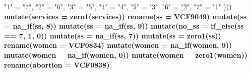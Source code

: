 \documentclass[
]{article}
\newenvironment{Shaded}{\begin{snugshade}}{\end{snugshade}}
\newcommand{\DataTypeTok}[1]{\textcolor[rgb]{0.13,0.29,0.53}{#1}}
\newcommand{\DecValTok}[1]{\textcolor[rgb]{0.00,0.00,0.81}{#1}}
\newcommand{\KeywordTok}[1]{\textcolor[rgb]{0.13,0.29,0.53}{\textbf{#1}}}
\newcommand{\NormalTok}[1]{#1}
\newcommand{\OperatorTok}[1]{\textcolor[rgb]{0.81,0.36,0.00}{\textbf{#1}}}
\newcommand{\StringTok}[1]{\textcolor[rgb]{0.31,0.60,0.02}{#1}}
\begin{document}
\begin{Shaded}
\begin{Highlighting}[]
{{{{{{{{{{{{{{{{{{{{{{{{{{{{{                                                                            \StringTok{"1"}\NormalTok{ =}\StringTok{ "7"}\NormalTok{,}
                                                                            \StringTok{"2"}\NormalTok{ =}\StringTok{ "6"}\NormalTok{,}
                                                                            \StringTok{"3"}\NormalTok{ =}\StringTok{ "5"}\NormalTok{,}
                                                                            \StringTok{"4"}\NormalTok{ =}\StringTok{ "4"}\NormalTok{,}
                                                                            \StringTok{"5"}\NormalTok{ =}\StringTok{ "3"}\NormalTok{,}
                                                                            \StringTok{"6"}\NormalTok{ =}\StringTok{ "2"}\NormalTok{,}
                                                                            \StringTok{"7"}\NormalTok{ =}\StringTok{ "1"}
\NormalTok{    )))}\OperatorTok{%>%}
\StringTok{    }\KeywordTok{mutate}\NormalTok{(}\DataTypeTok{services =} \KeywordTok{zero1}\NormalTok{(services))}\OperatorTok{%>%}
\StringTok{    }\KeywordTok{rename}\NormalTok{(}\DataTypeTok{ss =}\NormalTok{ VCF9049)}\OperatorTok{%>%}
\StringTok{    }\KeywordTok{mutate}\NormalTok{(}\DataTypeTok{ss =} \KeywordTok{na_if}\NormalTok{(ss, }\DecValTok{8}\NormalTok{))}\OperatorTok{%>%}
\StringTok{    }\KeywordTok{mutate}\NormalTok{(}\DataTypeTok{ss =} \KeywordTok{na_if}\NormalTok{(ss, }\DecValTok{9}\NormalTok{))}\OperatorTok{%>%}
\StringTok{    }\KeywordTok{mutate}\NormalTok{(}\DataTypeTok{no_ss =} \KeywordTok{if_else}\NormalTok{(ss }\OperatorTok{==}\StringTok{ }\DecValTok{7}\NormalTok{, }\DecValTok{1}\NormalTok{, }\DecValTok{0}\NormalTok{))}\OperatorTok{%>%}
\StringTok{    }\KeywordTok{mutate}\NormalTok{(}\DataTypeTok{ss =} \KeywordTok{na_if}\NormalTok{(ss, }\DecValTok{7}\NormalTok{))}\OperatorTok{%>%}
\StringTok{    }\KeywordTok{mutate}\NormalTok{(}\DataTypeTok{ss =} \KeywordTok{zero1}\NormalTok{(ss))}\OperatorTok{%>%}
\StringTok{    }\KeywordTok{rename}\NormalTok{(}\DataTypeTok{women =}\NormalTok{ VCF0834)}\OperatorTok{%>%}
\StringTok{    }\KeywordTok{mutate}\NormalTok{(}\DataTypeTok{women =} \KeywordTok{na_if}\NormalTok{(women, }\DecValTok{9}\NormalTok{))}\OperatorTok{%>%}
\StringTok{    }\KeywordTok{mutate}\NormalTok{(}\DataTypeTok{women =} \KeywordTok{na_if}\NormalTok{(women, }\DecValTok{0}\NormalTok{))}\OperatorTok{%>%}
\StringTok{    }\KeywordTok{mutate}\NormalTok{(}\DataTypeTok{women =} \KeywordTok{zero1}\NormalTok{(women))}\OperatorTok{%>%}
\StringTok{    }\KeywordTok{rename}\NormalTok{(}\DataTypeTok{abortion =}\NormalTok{ VCF0838)}\OperatorTok{%>%}
}}}}}}}}}}}}}}}}}}}}}}}}}}}}}}}}}}}}}}}}}}
\end{Highlighting}
\end{Shaded}
\end{document}
